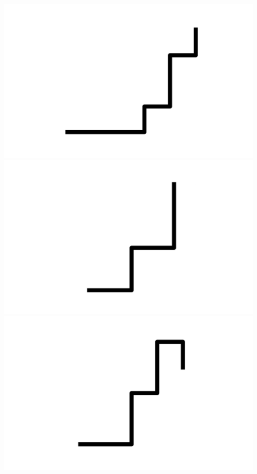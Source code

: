 \documentclass[]{report}
\begin{document}
\includegraphics[scale=.1]{pictures/21/state_cluster_shapes_190.pdf} 
\includegraphics[scale=.1]{pictures/21/state_cluster_shapes_191.pdf} 
\includegraphics[scale=.1]{pictures/21/state_cluster_shapes_192.pdf} 
\end{document}
